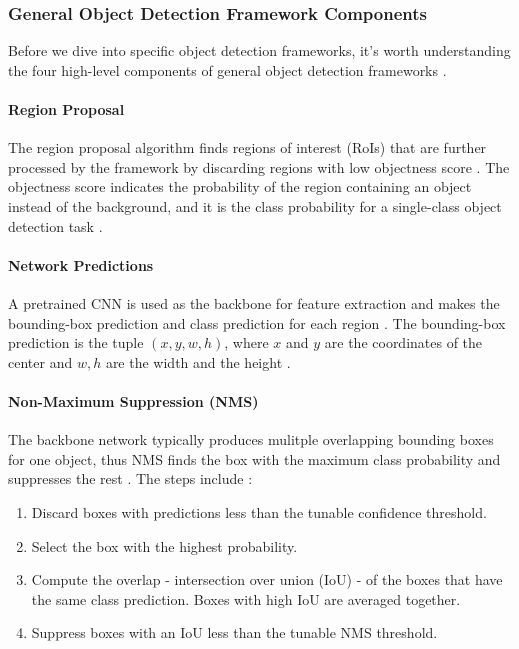\documentclass[a4paper,11pt,oneside]{article}
\begin{document}
  \subsubsection{General Object Detection Framework Components}

  Before we dive into specific object detection frameworks, it's worth understanding the four high-level components of
  general object detection frameworks \cite{elgendy2020deep}.

  \paragraph{Region Proposal}

  The region proposal algorithm finds regions of interest (RoIs) that are further processed by the framework by
  discarding regions with low objectness score \cite{elgendy2020deep}. The objectness score indicates the probability of
  the region containing an object instead of the background, and it is the class probability for a single-class object
  detection task \cite{elgendy2020deep}.

  \paragraph{Network Predictions}

  A pretrained CNN is used as the backbone for feature extraction and makes the bounding-box prediction and class prediction
  for each region \cite{elgendy2020deep}. The bounding-box prediction is the tuple $(x, y, w, h)$, where $x$ and $y$ are
  the coordinates of the center and $w, h$ are the width and the height \cite{elgendy2020deep}.

  \paragraph{Non-Maximum Suppression (NMS)}

  The backbone network typically produces mulitple overlapping bounding boxes for one object, thus NMS finds
  the box with the maximum class probability and suppresses the rest \cite{elgendy2020deep}. The steps include
  \cite{elgendy2020deep}:

  \begin{enumerate}
    \item Discard boxes with predictions less than the tunable confidence threshold.
    \item Select the box with the highest probability.
    \item Compute the overlap - intersection over union (IoU) - of the boxes that have the same class prediction.
    Boxes with high IoU are averaged together.
    \item Suppress boxes with an IoU less than the tunable NMS threshold.
  \end{enumerate}
\end{document}
